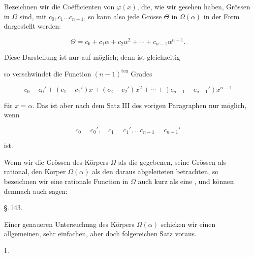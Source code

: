 Bezeichnen wir die Coëfficienten von $\varphi(x)$, die, wie wir gesehen haben, Grössen in $\Omega$ sind, mit $c_0, c_1 \ldots c_{n-1}$, so kann also jede Grösse $\Theta$ in $\Omega(\alpha)$ in der Form dargestellt werden:

\[
\Theta = c_0 + c_1\alpha + c_2\alpha^2 + \cdots + c_{n-1}\alpha^{n-1}.
\]

Diese Darstellung ist nur auf  möglich; denn ist gleichzeitig


so verschwindet die Function $(n-1)^{\text{ten}}$ Grades

\[
c_0 - c_0' + (c_1 - c_1')x + (c_2 - c_2')x^2 + \cdots + (c_{n-1} - c_{n-1}')x^{n-1}
\]

für $x = \alpha$. Das ist aber nach dem Satz III des vorigen Paragraphen nur möglich, wenn

\[
c_0 = c_0', \quad c_1 = c_1', \ldots c_{n-1} = c_{n-1}'
\]

ist.

Wenn wir die Grössen des Körpers $\Omega$ als die gegebenen, seine Grössen als rational, den Körper $\Omega(\alpha)$ als den daraus abgeleiteten betrachten, so bezeichnen wir eine rationale Function in $\Omega$ auch kurz als eine , und können demnach auch sagen:


\begin{center}
\S.\,143.

\end{center}

Einer genaueren Untersuchung des Körpers $\Omega(\alpha)$ schicken wir einen allgemeinen, sehr einfachen, aber doch folgereichen Satz voraus.

1. 
